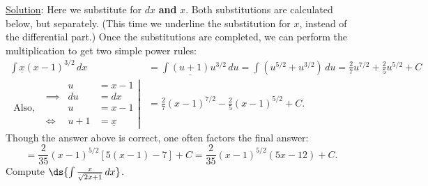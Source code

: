 \underline{Solution}: Here we substitute for $dx$ {\bf and} $x$.
Both substitutions are calculated below, but separately.
(This time we underline the substitution for $x$, instead of the
differential part.) Once the substitutions are completed, we can 
perform the multiplication to get two simple power rules:
\begin{align*}
\int \underline{{x}}(x-1)^{3/2}\,dx&=
\int\underline{{(u+1)}}u^{3/2}\,du
=\int\left(u^{5/2}+u^{3/2}\right)\,du
=\frac27u^{7/2}+\frac25u^{5/2}+C\\
\left.
{\begin{alignedat}{2}
&&u&=x-1\\
&\implies&du&=dx\\
\hline
\text{Also, } &&u&=x-1\\
&\iff& u+1&=\underline{{x}}\end{alignedat}}\right|
&=\frac27(x-1)^{7/2}-\frac25(x-1)^{5/2}+C.\end{align*}
Though the answer above is correct, one often factors the final 
answer:
$$=\frac2{35}(x-1)^{5/2}[5(x-1)-7]+C=\frac2{35}(x-1)^{5/2}(5x-12)+C.$$
\eex
\bex Compute $\ds{\int\frac{x}{\sqrt{2x+1}}\,dx}$.

